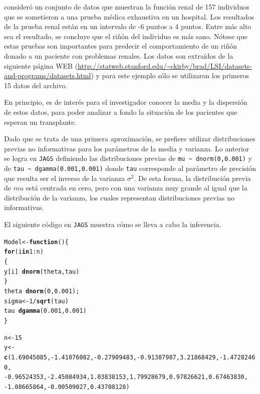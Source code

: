 \documentclass[10pt,openright]{book}\usepackage[]{graphicx}\usepackage[]{color}
\makeatletter
\newcommand{\hlnum}[1]{\textcolor[rgb]{0.686,0.059,0.569}{#1}}%
\newcommand{\hlopt}[1]{\textcolor[rgb]{0,0,0}{#1}}%
\newcommand{\hlstd}[1]{\textcolor[rgb]{0.345,0.345,0.345}{#1}}%
\newcommand{\hlkwa}[1]{\textcolor[rgb]{0.161,0.373,0.58}{\textbf{#1}}}%
\newcommand{\hlkwb}[1]{\textcolor[rgb]{0.69,0.353,0.396}{#1}}%
\newcommand{\hlkwd}[1]{\textcolor[rgb]{0.737,0.353,0.396}{\textbf{#1}}}%
\newenvironment{kframe}{%
 \def\at@end@of@kframe{}%
 \ifinner\ifhmode%
  \def\at@end@of@kframe{\end{minipage}}%
  \begin{minipage}{\columnwidth}%
 \fi\fi%
 \def\FrameCommand##1{\hskip\@totalleftmargin \hskip-\fboxsep
 \colorbox{shadecolor}{##1}\hskip-\fboxsep
     \hskip-\linewidth \hskip-\@totalleftmargin \hskip\columnwidth}%
 \MakeFramed {\advance\hsize-\width
   \@totalleftmargin\z@ \linewidth\hsize
   \@setminipage}}%
 {\par\unskip\endMakeFramed%
 \at@end@of@kframe}
\newenvironment{knitrout}{}{} %
\makeatother
\begin{document}
\begin{Eje}\label{Eje-Renal}
 consider\'o un conjunto de datos que muestran la funci\'on renal de 157 individuos que se sometieron a una prueba m\'edica exhaustiva en un hospital. Los resultados de la prueba renal est\'an en un intervalo de -6 puntos a 4 puntos. Entre m\'as alto sea el resultado, se concluye que el ri\~n\'on del individuo es m\'as sano. N\'otese que estas pruebas son importantes para predecir el comportamiento de un ri\~n\'on donado a un paciente con problemas renales. Los datos son extra\'idos de la siguiente p\'agina WEB  (\url{http://statweb.stanford.edu/~ckirby/brad/LSI/datasets-and-programs/datasets.html}) y para este ejemplo s\'olo se utilizaron los primeros 15 datos del archivo.

En principio, es de inter\'es para el investigador conocer la media y la dispersi\'on de estos datos, para poder analizar a fondo la situaci\'on de los pacientes que esperan un transplante.

Dado que se trata de una primera aproximaci\'on, se prefiere utilizar distribuciones previas no informativas para los par\'ametros de la media y varianza. Lo anterior se logra en \verb'JAGS' definiendo las distribuciones previas de \verb"mu ~ dnorm(0,0.001)" y de \verb"tau ~ dgamma(0.001,0.001)" donde \verb"tau" corresponde al par\'ametro de precisi\'on que resulta ser el inverso de la varianza $\sigma^2$. De esta forma, la distribuci\'on previa de $mu$ est\'a centrada en cero, pero con una varianza muy grande al igual que la distribuci\'on de la varianza, los cuales representan distribuciones previas no informativas.

El siguiente c\'odigo en \verb'JAGS' muestra c\'omo se lleva a cabo la inferencia.
\begin{knitrout}
\color{fgcolor}\begin{kframe}
\begin{alltt}
\hlstd{Model} \hlkwb{<-} \hlkwa{function}\hlstd{()\{}
  \hlkwa{for} \hlstd{(i} \hlkwa{in} \hlnum{1}\hlopt{:}\hlstd{n)}
  \hlstd{\{}
    \hlstd{y[i]} \hlopt{~} \hlkwd{dnorm}\hlstd{(theta,tau)}
  \hlstd{\}}
  \hlstd{theta} \hlopt{~} \hlkwd{dnorm}\hlstd{(}\hlnum{0}\hlstd{,}\hlnum{0.001}\hlstd{);}
  \hlstd{sigma} \hlkwb{<-} \hlnum{1}\hlopt{/}\hlkwd{sqrt}\hlstd{(tau)}
  \hlstd{tau} \hlopt{~} \hlkwd{dgamma}\hlstd{(}\hlnum{0.001}\hlstd{,} \hlnum{0.001}\hlstd{)}
\hlstd{\}}

\hlstd{n} \hlkwb{<-} \hlnum{15}
\hlstd{y} \hlkwb{<-} \hlkwd{c}\hlstd{(}\hlnum{1.69045085}\hlstd{,} \hlopt{-}\hlnum{1.41076082}\hlstd{,} \hlopt{-}\hlnum{0.27909483}\hlstd{,} \hlopt{-}\hlnum{0.91387987}\hlstd{,} \hlnum{3.21868429}\hlstd{,} \hlopt{-}\hlnum{1.47282460}\hlstd{,}
       \hlopt{-}\hlnum{0.96524353}\hlstd{,} \hlopt{-}\hlnum{2.45084934}\hlstd{,} \hlnum{1.03838153}\hlstd{,} \hlnum{1.79928679}\hlstd{,} \hlnum{0.97826621}\hlstd{,} \hlnum{0.67463830}\hlstd{,}
       \hlopt{-}\hlnum{1.08665864}\hlstd{,} \hlopt{-}\hlnum{0.00509027}\hlstd{,} \hlnum{0.43708128}\hlstd{)}


\end{alltt}
\end{kframe}
\end{knitrout}
\end{Eje}
\end{document}
